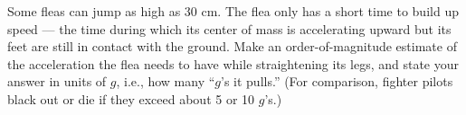 Some fleas can jump as high as 30 cm. The flea only has
a short time to build up speed --- the time during which its
center of mass is accelerating upward but its feet are still
in contact with the ground. Make an order-of-magnitude
estimate of the acceleration the flea needs to have while
straightening its legs, and state your answer in units of
$g$, i.e., how many ``$g$'s it pulls.'' (For comparison,
fighter pilots black out or die if they exceed about 5 or 10 $g$'s.)
